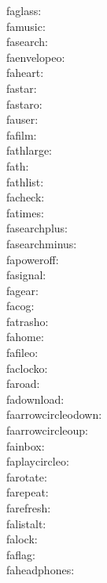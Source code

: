 faglass: {\FA \faglass} \\
famusic: {\FA \famusic} \\
fasearch: {\FA \fasearch} \\
faenvelopeo: {\FA \faenvelopeo} \\
faheart: {\FA \faheart} \\
fastar: {\FA \fastar} \\
fastaro: {\FA \fastaro} \\
fauser: {\FA \fauser} \\
fafilm: {\FA \fafilm} \\
fathlarge: {\FA \fathlarge} \\
fath: {\FA \fath} \\
fathlist: {\FA \fathlist} \\
facheck: {\FA \facheck} \\
fatimes: {\FA \fatimes} \\
fasearchplus: {\FA \fasearchplus} \\
fasearchminus: {\FA \fasearchminus} \\
fapoweroff: {\FA \fapoweroff} \\
fasignal: {\FA \fasignal} \\
fagear: {\FA \fagear} \\
facog: {\FA \facog} \\
fatrasho: {\FA \fatrasho} \\
fahome: {\FA \fahome} \\
fafileo: {\FA \fafileo} \\
faclocko: {\FA \faclocko} \\
faroad: {\FA \faroad} \\
fadownload: {\FA \fadownload} \\
faarrowcircleodown: {\FA \faarrowcircleodown} \\
faarrowcircleoup: {\FA \faarrowcircleoup} \\
fainbox: {\FA \fainbox} \\
faplaycircleo: {\FA \faplaycircleo} \\
farotate: {\FA \farotate} \\
farepeat: {\FA \farepeat} \\
farefresh: {\FA \farefresh} \\
falistalt: {\FA \falistalt} \\
falock: {\FA \falock} \\
faflag: {\FA \faflag} \\
faheadphones: {\FA \faheadphones} \\
